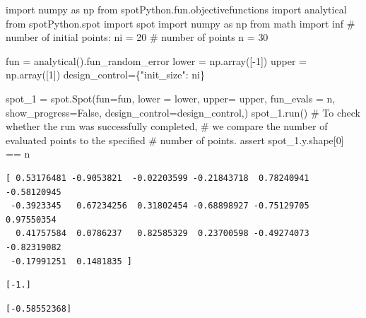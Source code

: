 \documentclass[
  letterpaper,
  DIV=11,
  numbers=noendperiod]{scrreprt}
\newenvironment{Shaded}{\begin{snugshade}}{\end{snugshade}}
\newcommand{\CommentTok}[1]{\textcolor[rgb]{0.37,0.37,0.37}{#1}}
\newcommand{\ControlFlowTok}[1]{\textcolor[rgb]{0.00,0.23,0.31}{#1}}
\newcommand{\DecValTok}[1]{\textcolor[rgb]{0.68,0.00,0.00}{#1}}
\newcommand{\ImportTok}[1]{\textcolor[rgb]{0.00,0.46,0.62}{#1}}
\newcommand{\NormalTok}[1]{\textcolor[rgb]{0.00,0.23,0.31}{#1}}
\newcommand{\OperatorTok}[1]{\textcolor[rgb]{0.37,0.37,0.37}{#1}}
\newcommand{\StringTok}[1]{\textcolor[rgb]{0.13,0.47,0.30}{#1}}
\newcommand{\VariableTok}[1]{\textcolor[rgb]{0.07,0.07,0.07}{#1}}
\begin{document}
\begin{Shaded}
\begin{Highlighting}[]
\ImportTok{import}\NormalTok{ numpy }\ImportTok{as}\NormalTok{ np}
\ImportTok{from}\NormalTok{ spotPython.fun.objectivefunctions }\ImportTok{import}\NormalTok{ analytical}
\ImportTok{from}\NormalTok{ spotPython.spot }\ImportTok{import}\NormalTok{ spot}
\ImportTok{import}\NormalTok{ numpy }\ImportTok{as}\NormalTok{ np}
\ImportTok{from}\NormalTok{ math }\ImportTok{import}\NormalTok{ inf}
\CommentTok{\# number of initial points:}
\NormalTok{ni }\OperatorTok{=} \DecValTok{20}
\CommentTok{\# number of points}
\NormalTok{n }\OperatorTok{=} \DecValTok{30}

\NormalTok{fun }\OperatorTok{=}\NormalTok{ analytical().fun\_random\_error}
\NormalTok{lower }\OperatorTok{=}\NormalTok{ np.array([}\OperatorTok{{-}}\DecValTok{1}\NormalTok{])}
\NormalTok{upper }\OperatorTok{=}\NormalTok{ np.array([}\DecValTok{1}\NormalTok{])}
\NormalTok{design\_control}\OperatorTok{=}\NormalTok{\{}\StringTok{"init\_size"}\NormalTok{: ni\}}

\NormalTok{spot\_1 }\OperatorTok{=}\NormalTok{ spot.Spot(fun}\OperatorTok{=}\NormalTok{fun,}
\NormalTok{            lower }\OperatorTok{=}\NormalTok{ lower,}
\NormalTok{            upper}\OperatorTok{=}\NormalTok{ upper,}
\NormalTok{            fun\_evals }\OperatorTok{=}\NormalTok{ n,}
\NormalTok{            show\_progress}\OperatorTok{=}\VariableTok{False}\NormalTok{,}
\NormalTok{            design\_control}\OperatorTok{=}\NormalTok{design\_control,)}
\NormalTok{spot\_1.run()}
\CommentTok{\# To check whether the run was successfully completed,}
\CommentTok{\# we compare the number of evaluated points to the specified}
\CommentTok{\# number of points.}
\ControlFlowTok{assert}\NormalTok{ spot\_1.y.shape[}\DecValTok{0}\NormalTok{] }\OperatorTok{==}\NormalTok{ n}
\end{Highlighting}
\end{Shaded}

\begin{verbatim}
[ 0.53176481 -0.9053821  -0.02203599 -0.21843718  0.78240941 -0.58120945
 -0.3923345   0.67234256  0.31802454 -0.68898927 -0.75129705  0.97550354
  0.41757584  0.0786237   0.82585329  0.23700598 -0.49274073 -0.82319082
 -0.17991251  0.1481835 ]
\end{verbatim}

\begin{verbatim}
[-1.]
\end{verbatim}

\begin{verbatim}
[-0.58552368]
\end{verbatim}
\end{document}
